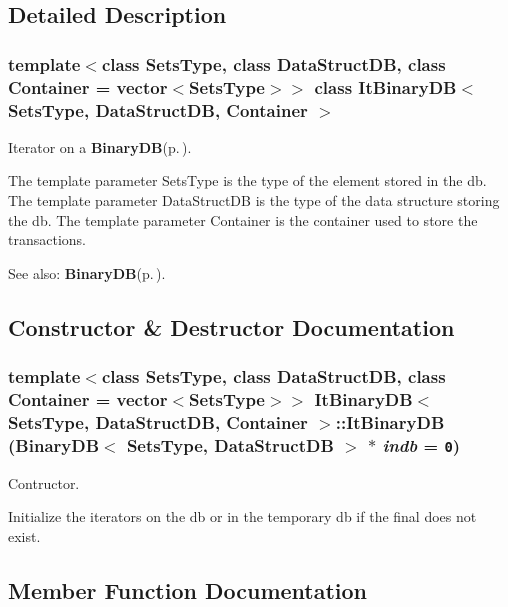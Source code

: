\subsection{Detailed Description}
\subsubsection*{template$<$class Sets\-Type, class Data\-Struct\-DB, class Container = vector$<$Sets\-Type$>$$>$ class It\-Binary\-DB$<$ Sets\-Type, Data\-Struct\-DB, Container $>$}

Iterator on a {\bf Binary\-DB}{\rm (p.\,\pageref{class_binary_d_b})}. 

The template parameter Sets\-Type is the type of the element stored in the db. The template parameter Data\-Struct\-DB is the type of the data structure storing the db. The template parameter Container is the container used to store the transactions.

\begin{Desc}
\item[See also:]{\bf Binary\-DB}{\rm (p.\,\pageref{class_binary_d_b})}. \end{Desc}




\subsection{Constructor \& Destructor Documentation}
\subsubsection{\setlength{\rightskip}{0pt plus 5cm}template$<$class Sets\-Type, class Data\-Struct\-DB, class Container = vector$<$Sets\-Type$>$$>$ {\bf It\-Binary\-DB}$<$ Sets\-Type, Data\-Struct\-DB, Container $>$::{\bf It\-Binary\-DB} ({\bf Binary\-DB}$<$ Sets\-Type, Data\-Struct\-DB $>$ $\ast$ {\em indb} = {\tt 0})\hspace{0.3cm}{\tt  [inline]}}\label{class_it_binary_d_b_79ec8ddfa713a15b83ed1ee55de9a4cb}


Contructor. 

Initialize the iterators on the db or in the temporary db if the final does not exist. 

\subsection{Member Function Documentation}
